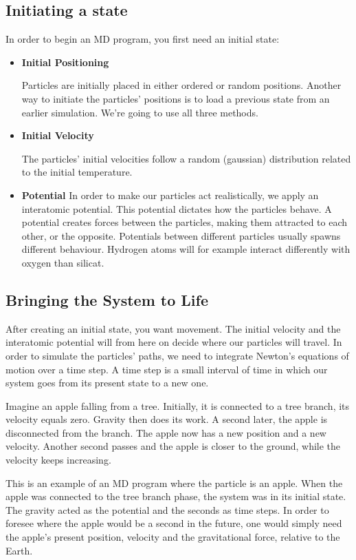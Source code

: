 \documentclass[10pt, a4paper]{report}
\begin{document}
\subsection*{Initiating a state}
In order to begin an MD program, you first need an initial state:
\begin{itemize}
 \item {\bf{Initial Positioning}}
 
Particles are initially placed in either ordered or random positions.
Another way to initiate the particles' positions is to load a previous state from an earlier simulation.
We're going to use all three methods.
\item {\bf{Initial Velocity}}

The particles' initial velocities follow a random (gaussian) distribution related to the initial temperature.
\item {\bf{Potential}}
In order to make our particles act realistically, we apply an interatomic potential. 
This potential dictates how the particles behave. A potential creates forces between the particles, 
making them attracted to each other, or the opposite.
Potentials between different particles usually spawns different behaviour. 
Hydrogen atoms will for example interact differently with oxygen than silicat.
\end{itemize}
\subsection*{Bringing the System to Life}
After creating an initial state, you want movement. The initial velocity and the interatomic 
potential will from here on decide where our particles will travel. In order to simulate the particles' paths,
we need to integrate Newton's equations of motion over a time step. A time step is a small interval of time in 
which our system goes from its present state to a new one. 

Imagine an apple falling from a tree. Initially, it is connected to a tree branch, its velocity equals zero.
Gravity then does its work.
A second later, the apple is disconnected from the branch. The apple now has a new position and a new velocity.
Another second passes and the apple is closer to the ground, while the velocity keeps increasing.

This is an example of an MD program where the particle is an apple. 
When the apple was connected to the tree branch phase, the system was in its initial state. 
The gravity acted as the potential and the seconds as time steps. In order to foresee where the apple 
would be a second in the future, one would simply need the apple's present position, velocity and the gravitational force, 
relative to the Earth.
\end{document}
